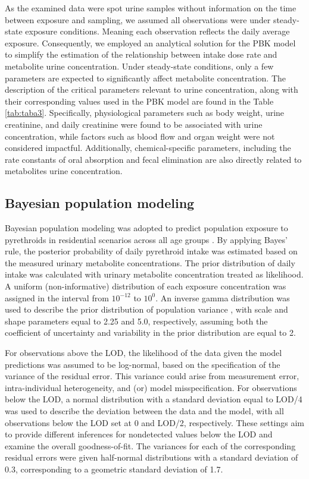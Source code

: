 \documentclass[toxics,article,submit,pdftex,moreauthors]{Definitions/mdpi}
\begin{document}
As the examined data were spot urine samples without information on the
time between exposure and sampling, we assumed all observations were
under steady-state exposure conditions. Meaning each observation
reflects the daily average exposure. Consequently, we employed an
analytical solution for the PBK model to simplify the estimation of the
relationship between intake dose rate and metabolite urine
concentration. Under steady-state conditions, only a few parameters are
expected to significantly affect metabolite concentration. The
description of the critical parameters relevant to urine concentration,
along with their corresponding values used in the PBK model are found in
the Table \ref{tab:taba3}. Specifically, physiological parameters such
as body weight, urine creatinine, and daily creatinine were found to be
associated with urine concentration, while factors such as blood flow
and organ weight were not considered impactful. Additionally,
chemical-specific parameters, including the rate constants of oral
absorption and fecal elimination are also directly related to
metabolites urine concentration.

\subsection{Bayesian population
modeling}\label{bayesian-population-modeling}

Bayesian population modeling was adopted to predict population exposure
to pyrethroids in residential scenarios across all age groups
\citep{allen2007use, lyons2008computational}. By applying Bayes' rule,
the posterior probability of daily pyrethroid intake was estimated based
on the measured urinary metabolite concentrations. The prior
distribution of daily intake was calculated with urinary metabolite
concentration treated as likelihood. A uniform (non-informative)
distribution of each exposure concentration was assigned in the interval
from \(10^{-12}\) to \(10^0\). An inverse gamma distribution was used to
describe the prior distribution of population variance
\citep{lyons2008computational}, with scale and shape parameters equal to
2.25 and 5.0, respectively, assuming both the coefficient of uncertainty
and variability in the prior distribution are equal to 2.

For observations above the LOD, the likelihood of the data given the
model predictions was assumed to be log-normal, based on the
specification of the variance of the residual error. This variance could
arise from measurement error, intra-individual heterogeneity, and (or)
model misspecification. For observations below the LOD, a normal
distribution with a standard deviation equal to LOD/4 was used to
describe the deviation between the data and the model, with all
observations below the LOD set at 0 and LOD/2, respectively. These
settings aim to provide different inferences for nondetected values
below the LOD and examine the overall goodness-of-fit. The variances for
each of the corresponding residual errors were given half-normal
distributions with a standard deviation of 0.3, corresponding to a
geometric standard deviation of 1.7.
\end{document}
